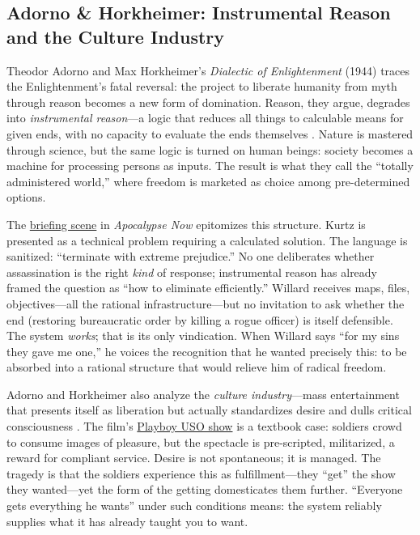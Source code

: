 \subsection*{Adorno \& Horkheimer: Instrumental Reason and the Culture Industry}
\label{ssec:v-adorno-horkheimer}
Theodor Adorno and Max Horkheimer's \textit{Dialectic of Enlightenment} (1944) traces the
Enlightenment's fatal reversal: the project to liberate humanity from myth through reason
becomes a new form of domination. Reason, they argue, degrades into \emph{instrumental
	reason}---a logic that reduces all things to calculable means for given ends, with no capacity
to evaluate the ends themselves \parencite{AdornoHorkheimer2002}. Nature is mastered through
science, but the same logic is turned on human beings: society becomes a machine for
processing persons as inputs. The result is what they call the ``totally administered world,''
where freedom is marketed as choice among pre-determined options.

The \hyperref[scene:briefing]{briefing scene} in \textit{Apocalypse Now} epitomizes this
structure. Kurtz is presented as a technical problem requiring a calculated solution. The
language is sanitized: ``terminate with extreme prejudice.'' No one deliberates whether
assassination is the right \emph{kind} of
response; instrumental reason has already framed the question as ``how to eliminate
efficiently.'' Willard receives maps, files, objectives---all the rational infrastructure---but
no invitation to ask whether the end (restoring bureaucratic order by killing a rogue officer)
is itself defensible. The system \emph{works}; that is its only vindication. When Willard says
``for my sins they gave me one,'' he voices the recognition that he wanted precisely this: to
be absorbed into a rational structure that would relieve him of radical freedom.

Adorno and Horkheimer also analyze the \emph{culture industry}---mass entertainment that
presents itself as liberation but actually standardizes desire and dulls critical consciousness
\parencite{AdornoHorkheimer2002}. The film's \hyperref[scene:playboy-show]{Playboy USO show} is
a textbook case: soldiers crowd to consume images of pleasure, but the spectacle is
pre-scripted, militarized, a reward for compliant service. Desire is not spontaneous; it is
managed. The tragedy is that the
soldiers experience this as fulfillment---they ``get'' the show they wanted---yet the form of
the getting domesticates them further. ``Everyone gets everything he wants'' under such
conditions means: the system reliably supplies what it has already taught you to want.

